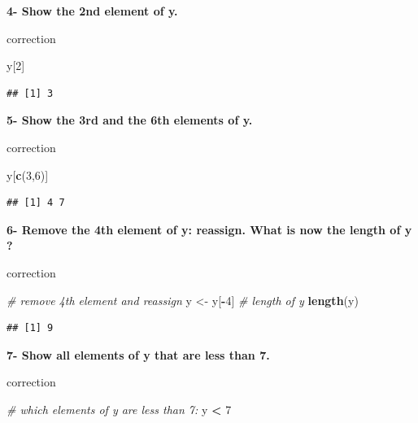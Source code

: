 \documentclass[]{book}
\newenvironment{Shaded}{\begin{snugshade}}{\end{snugshade}}
\newcommand{\CommentTok}[1]{\textcolor[rgb]{0.56,0.35,0.01}{\textit{#1}}}
\newcommand{\DecValTok}[1]{\textcolor[rgb]{0.00,0.00,0.81}{#1}}
\newcommand{\KeywordTok}[1]{\textcolor[rgb]{0.13,0.29,0.53}{\textbf{#1}}}
\newcommand{\NormalTok}[1]{#1}
\newcommand{\OperatorTok}[1]{\textcolor[rgb]{0.81,0.36,0.00}{\textbf{#1}}}
\newcommand{\StringTok}[1]{\textcolor[rgb]{0.31,0.60,0.02}{#1}}
\begin{document}
\textbf{4- Show the 2nd element of y.}

correction

\begin{Shaded}
\begin{Highlighting}[]
\NormalTok{y[}\DecValTok{2}\NormalTok{]}
\end{Highlighting}
\end{Shaded}

\begin{verbatim}
## [1] 3
\end{verbatim}

\textbf{5- Show the 3rd and the 6th elements of y.}

correction

\begin{Shaded}
\begin{Highlighting}[]
\NormalTok{y[}\KeywordTok{c}\NormalTok{(}\DecValTok{3}\NormalTok{,}\DecValTok{6}\NormalTok{)]}
\end{Highlighting}
\end{Shaded}

\begin{verbatim}
## [1] 4 7
\end{verbatim}

\textbf{6- Remove the 4th element of y: reassign. What is now the length of y ?}

correction

\begin{Shaded}
\begin{Highlighting}[]
\CommentTok{# remove 4th element and reassign}
\NormalTok{y <-}\StringTok{ }\NormalTok{y[}\OperatorTok{-}\DecValTok{4}\NormalTok{]}
\CommentTok{# length of y}
\KeywordTok{length}\NormalTok{(y)}
\end{Highlighting}
\end{Shaded}

\begin{verbatim}
## [1] 9
\end{verbatim}

\textbf{7- Show all elements of y that are less than 7.}

correction

\begin{Shaded}
\begin{Highlighting}[]
\CommentTok{# which elements of y are less than 7:}
\NormalTok{y }\OperatorTok{<}\StringTok{ }\DecValTok{7}
\end{Highlighting}
\end{Shaded}
\end{document}
